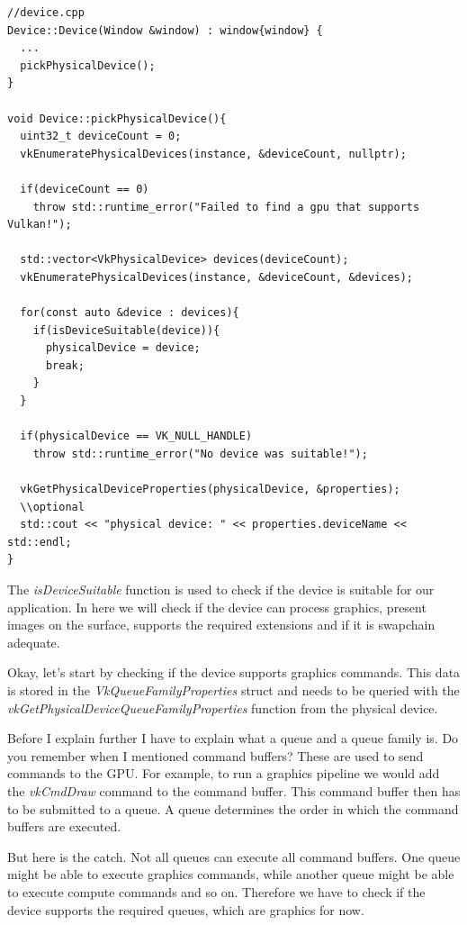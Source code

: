 \documentclass[12pt]{report} \usepackage{preamble}
\begin{document}
\begin{lstlisting}[Language=C++]
//device.cpp
Device::Device(Window &window) : window{window} {
  ...
  pickPhysicalDevice();
}

void Device::pickPhysicalDevice(){
  uint32_t deviceCount = 0;
  vkEnumeratePhysicalDevices(instance, &deviceCount, nullptr);

  if(deviceCount == 0)
    throw std::runtime_error("Failed to find a gpu that supports Vulkan!");

  std::vector<VkPhysicalDevice> devices(deviceCount);
  vkEnumeratePhysicalDevices(instance, &deviceCount, &devices);

  for(const auto &device : devices){
    if(isDeviceSuitable(device)){
      physicalDevice = device;
      break;
    }
  }

  if(physicalDevice == VK_NULL_HANDLE)
    throw std::runtime_error("No device was suitable!");

  vkGetPhysicalDeviceProperties(physicalDevice, &properties);
  \\optional
  std::cout << "physical device: " << properties.deviceName << std::endl;
}
\end{lstlisting}

The \textit{isDeviceSuitable} function is used to check if the device is suitable for our application.
In here we will check if the device can process graphics, present images on the surface, supports the required extensions
and if it is swapchain adequate.

Okay, let's start by checking if the device supports graphics commands. This data is stored in
the \textit{VkQueueFamilyProperties} struct and needs to be queried with the \textit{vkGetPhysicalDeviceQueueFamilyProperties}
function from the physical device.

Before I explain further I have to explain what a queue and a queue family is. Do you remember
when I mentioned command buffers? These are used to send commands to the \ac{GPU}. For example, to run a
graphics pipeline we would add the \textit{vkCmdDraw} command to the command buffer. This command
buffer then has to be submitted to a queue. A queue determines the order in which the command buffers
are executed.

But here is the catch. Not all queues can execute all command buffers. One queue might be able to
execute graphics commands, while another queue might be able to execute compute commands and so on.
Therefore we have to check if the device supports the required queues, which are graphics for now.
\end{document}
